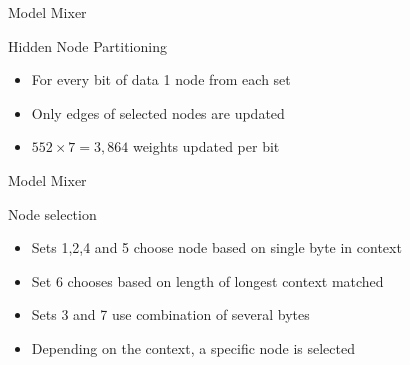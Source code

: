 \documentclass[11pt,usenames,dvipsnames]{beamer}
\begin{document}
\begin{frame}{Model Mixer}
	\begin{exampleblock}{Hidden Node Partitioning}
		\begin{itemize}
			\item For every bit of data 1 node from each set
			\item Only edges of selected nodes are updated
			\item $552\times 7 = 3,864$ weights updated per bit
		\end{itemize}
	\end{exampleblock}

\end{frame}

\begin{frame}{Model Mixer}
	\begin{block}{Node selection}
		\begin{itemize}
			\item Sets 1,2,4 and 5 choose node based on single byte in context
			\item Set 6 chooses based on length of longest context matched
			\item Sets 3 and 7 use combination of several bytes
			\item Depending on the context, a specific node is selected
		\end{itemize}
	\end{block}
	
\end{frame}
\end{document}
